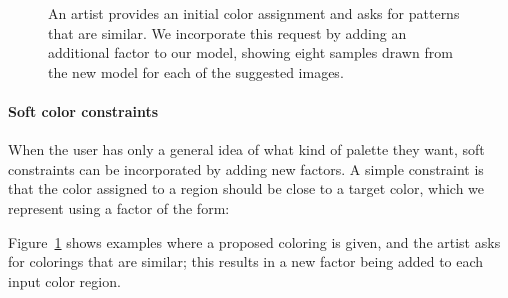 \begin{figure}[ht]
\caption{An artist provides an initial color assignment and asks for patterns that are similar. We incorporate this request by adding an additional factor to our model, showing eight samples drawn from the new model for each of the suggested images.~}
\label{fig:nearbySuggestions}
\vspace{-1.0em}
\end{figure}

\paragraph{Soft color constraints} When the user has only a general idea of what kind of palette they want, soft constraints can be incorporated by adding new factors. A simple constraint is that the color assigned to a region should be close to a target color, which we represent using a factor of the form:


Figure~\ref{fig:nearbySuggestions} shows examples where a proposed coloring is given, and the artist asks for colorings that are similar; this results in a new factor being added to each input color region. 


